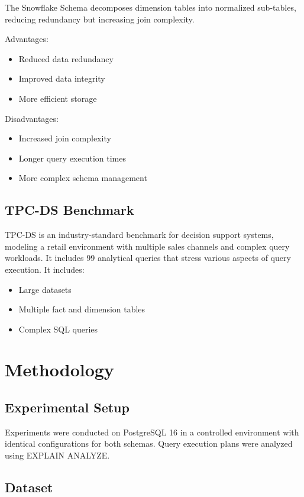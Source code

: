 \documentclass[conference]{IEEEtran}
\begin{document}
The Snowflake Schema decomposes dimension tables into normalized sub-tables, reducing redundancy but increasing join complexity.

Advantages:
\begin{itemize}
    \item Reduced data redundancy
    \item Improved data integrity
    \item More efficient storage
\end{itemize}

Disadvantages:
\begin{itemize}
    \item Increased join complexity
    \item Longer query execution times
    \item More complex schema management
\end{itemize}

\subsection{TPC-DS Benchmark}

TPC-DS is an industry-standard benchmark for decision support systems, modeling a retail environment with multiple sales channels and complex query workloads. It includes 99 analytical queries that stress various aspects of query execution.
It includes:

\begin{itemize}
    \item Large datasets
    \item Multiple fact and dimension tables
    \item Complex SQL queries
\end{itemize}

\section{Methodology}

\subsection{Experimental Setup}

Experiments were conducted on PostgreSQL 16 in a controlled environment with identical configurations for both schemas. Query execution plans were analyzed using EXPLAIN ANALYZE.

\subsection{Dataset}
\end{document}
